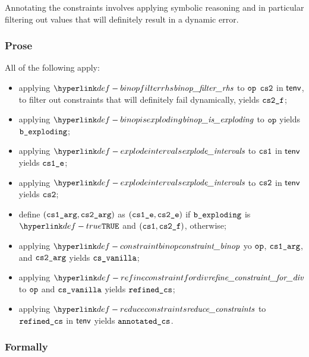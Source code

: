 Annotating the constraints involves applying symbolic reasoning and in particular filtering out values that
will definitely result in a dynamic error.

\subsubsection{Prose}
All of the following apply:
\begin{itemize}
  \item applying $\binopfilterrhs$ to $\op$ $\cstwo$ in $\tenv$, to filter out constraints that will definitely fail dynamically, yields $\cstwof$;
  \item applying $\binopisexploding$ to $\op$ yields $\vbexploding$;
  \item applying $\explodeintervals$ to $\csone$ in $\tenv$ yields $\csonee$;
  \item applying $\explodeintervals$ to $\cstwo$ in $\tenv$ yields $\cstwo$;
  \item define $(\csonearg, \cstwoarg)$ as $(\csonee, \cstwoe)$ if $\vbexploding$ is $\True$ and $(\csone, \cstwof)$, otherwise;
  \item applying $\constraintbinop$ yo $\op$, $\csonearg$, and $\cstwoarg$ yields $\csvanilla$;
  \item applying $\refineconstraintfordiv$ to $\op$ and $\csvanilla$ yields $\refinedcs$\ProseOrTypeError;
  \item applying $\reduceconstraints$ to $\refinedcs$ in $\tenv$ yields $\annotatedcs$.
\end{itemize}

\subsubsection{Formally}
\begin{mathpar}
\end{mathpar}

